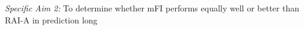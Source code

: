 \emph{Specific Aim 2:} To determine whether mFI performs equally well or better than RAI-A in prediction long